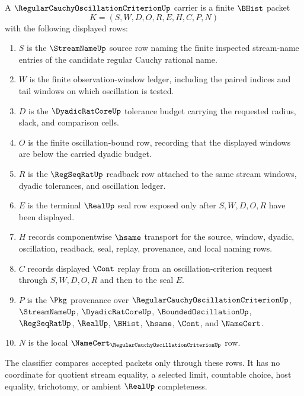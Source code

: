 \begin{definition}
\label{def:regular-cauchy-oscillation-criterion-carrier}
A $\RegularCauchyOscillationCriterionUp$ carrier is a finite $\BHist$ packet
$$
K=(S,W,D,O,R,E,H,C,P,N)
$$
with the following displayed rows:
\begin{enumerate}
\item $S$ is the $\StreamNameUp$ source row naming the finite inspected stream-name entries of the candidate regular Cauchy rational name.
\item $W$ is the finite observation-window ledger, including the paired indices and tail windows on which oscillation is tested.
\item $D$ is the $\DyadicRatCoreUp$ tolerance budget carrying the requested radius, slack, and comparison cells.
\item $O$ is the finite oscillation-bound row, recording that the displayed windows are below the carried dyadic budget.
\item $R$ is the $\RegSeqRatUp$ readback row attached to the same stream windows, dyadic tolerances, and oscillation ledger.
\item $E$ is the terminal $\RealUp$ seal row exposed only after $S,W,D,O,R$ have been displayed.
\item $H$ records componentwise $\hsame$ transport for the source, window, dyadic, oscillation, readback, seal, replay, provenance, and local naming rows.
\item $C$ records displayed $\Cont$ replay from an oscillation-criterion request through $S,W,D,O,R$ and then to the seal $E$.
\item $P$ is the $\Pkg$ provenance over $\RegularCauchyOscillationCriterionUp$, $\StreamNameUp$, $\DyadicRatCoreUp$, $\BoundedOscillationUp$, $\RegSeqRatUp$, $\RealUp$, $\BHist$, $\hsame$, $\Cont$, and $\NameCert$.
\item $N$ is the local $\NameCert_{\RegularCauchyOscillationCriterionUp}$ row.
\end{enumerate}
The classifier compares accepted packets only through these rows. It has no coordinate for quotient stream equality, a selected limit, countable choice, host equality, trichotomy, or ambient $\RealUp$ completeness.
\end{definition}

